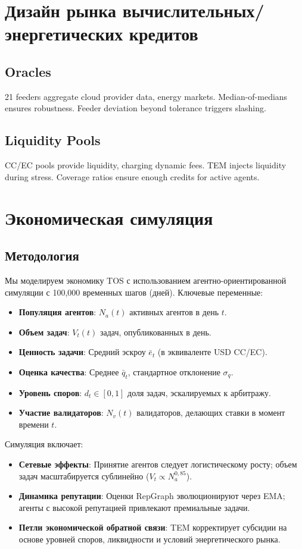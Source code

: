 \documentclass[11pt]{article}
\begin{document}
\section{Дизайн рынка вычислительных/энергетических кредитов}
\subsection{Oracles}
21 feeders aggregate cloud provider data, energy markets. Median-of-medians ensures robustness. Feeder deviation beyond tolerance triggers slashing.

\subsection{Liquidity Pools}
CC/EC pools provide liquidity, charging dynamic fees. TEM injects liquidity during stress. Coverage ratios ensure enough credits for active agents.

\section{Экономическая симуляция}
\label{sec:econ-sim}

\subsection{Методология}
Мы моделируем экономику TOS с использованием агентно-ориентированной симуляции с 100,000 временных шагов (дней). Ключевые переменные:
\begin{itemize}[noitemsep]
  \item \textbf{Популяция агентов}: $N_a(t)$ активных агентов в день $t$.
  \item \textbf{Объем задач}: $V_t(t)$ задач, опубликованных в день.
  \item \textbf{Ценность задачи}: Средний эскроу $\bar{e}_t$ (в эквиваленте USD CC/EC).
  \item \textbf{Оценка качества}: Среднее $\bar{q}_t$, стандартное отклонение $\sigma_q$.
  \item \textbf{Уровень споров}: $d_t \in [0,1]$ доля задач, эскалируемых к арбитражу.
  \item \textbf{Участие валидаторов}: $N_v(t)$ валидаторов, делающих ставки в момент времени $t$.
\end{itemize}
Симуляция включает:
\begin{itemize}[noitemsep]
  \item \textbf{Сетевые эффекты}: Принятие агентов следует логистическому росту; объем задач масштабируется сублинейно ($V_t \propto N_a^{0,85}$).
  \item \textbf{Динамика репутации}: Оценки RepGraph эволюционируют через EMA; агенты с высокой репутацией привлекают премиальные задачи.
  \item \textbf{Петли экономической обратной связи}: TEM корректирует субсидии на основе уровней споров, ликвидности и условий энергетического рынка.
\end{itemize}
\end{document}
